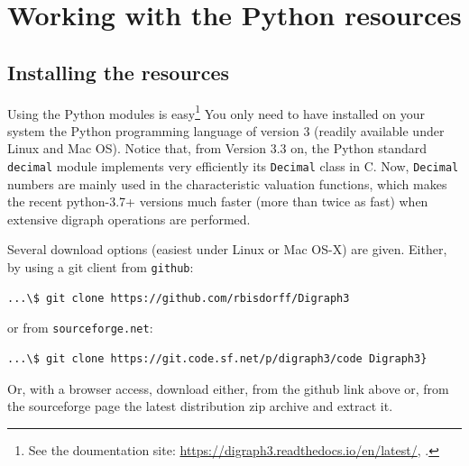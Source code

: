 %
%
%
\chapter{Working with the \Digraph Python resources}
\label{sec:1} %



\section{Installing the \Digraph resources}
\label{sec:1.1}

Using the \Digraph Python modules is easy\footnote{See the \Digraph doumentation site: \url{https://digraph3.readthedocs.io/en/latest/}, \citet{BIS-2021}.} You only need to have installed on your system the Python programming language of version 3 (readily available under Linux and Mac OS). Notice that, from Version 3.3 on, the Python standard \texttt{decimal} module implements very efficiently its \texttt{Decimal} class in C. Now, \texttt{Decimal} numbers are mainly used in the \Digraph characteristic valuation functions, which makes the recent python-3.7+ versions much faster (more than twice as fast) when extensive digraph operations are performed.

Several download options (easiest under Linux or Mac OS-X) are given. Either, by using a git client from \texttt{github}:
\begin{footnotesize}
\begin{verbatim}
...\$ git clone https://github.com/rbisdorff/Digraph3
\end{verbatim}
\end{footnotesize}
or from \texttt{sourceforge.net}:
\begin{scriptsize}
\begin{verbatim}
...\$ git clone https://git.code.sf.net/p/digraph3/code Digraph3}
\end{verbatim}
\end{scriptsize}
Or, with a browser access, download either, from the github link above or, from the sourceforge page the latest distribution zip archive and extract it.

